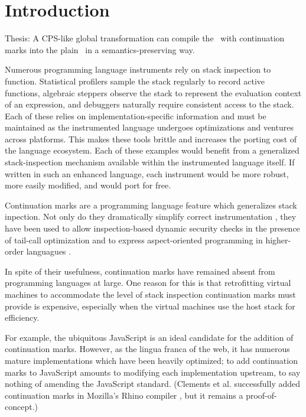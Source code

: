 \chapter{Introduction}

Thesis: A CPS-like global transformation can compile the \lc\ with continuation marks into
the plain \lc\ in a semantics-preserving way.

Numerous programming language instruments rely on stack inspection to function. Statistical profilers sample the stack regularly to record active functions, algebraic steppers observe the stack to represent the evaluation context of an expression, and debuggers naturally require consistent access to the stack. Each of these relies on implementation-specific information and must be maintained as the instrumented language undergoes optimizations and ventures across platforms. This makes these tools brittle and increases the porting cost of the language ecosystem. Each of these examples would benefit from a generalized stack-inspection mechanism available within the instrumented language itself. If written in such an enhanced language, each instrument would be more robust, more easily modified, and would port for free.

Continuation marks \cite{clements2006portable} are a programming language feature which generalizes stack inpection. Not only do they dramatically simplify correct instrumentation \cite{clements2001modeling}, they have been used to allow inspection-based dynamic security checks in the presence of tail-call optimization \cite{clements2004tail} and to express aspect-oriented programming in higher-order languagues \cite{tucker2003pointcuts}.

In spite of their usefulness, continuation marks have remained absent from programming languages at large. One reason for this is that retrofitting virtual machines to accommodate the level of stack inspection continuation marks must provide is expensive, especially when the virtual machines use the host stack for efficiency.

For example, the ubiquitous JavaScript is an ideal candidate for the addition of continuation marks. However, as the lingua franca of the web, it has numerous mature implementations which have been heavily optimized; to add continuation marks to JavaScript amounts to modifying each implementation upstream, to say nothing of amending the JavaScript standard. (Clements et al. successfully added continuation marks in Mozilla's Rhino compiler \cite{clements2008implementing}, but it remains a proof-of-concept.)

